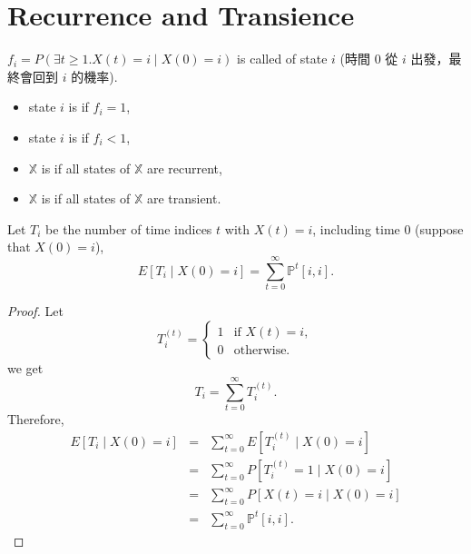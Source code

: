 \section{Recurrence and Transience}

\begin{definition}
$ f_{i} = P(\exists t \ge 1. X(t) = i \mid X(0) = i) $ is called  of state $ i $ {\small \color{gray} (時間 $ 0 $ 從 $ i $ 出發，最終會回到 $ i $ 的機率)}.
\begin{itemize}
  \item state $ i $ is  if $ f_{i} = 1 $,
  \item state $ i $ is  if $ f_{i} < 1 $,
  \item $ \mathbb{X} $ is  if all states of $ \mathbb{X} $ are recurrent,
  \item $ \mathbb{X} $ is  if all states of $ \mathbb{X} $ are transient.
\end{itemize}
\end{definition}

\begin{observation}
Let $ T_{i} $ be the number of time indices $ t $ with $ X(t) = i $, including time $ 0 $ (suppose that $ X(0) = i $),
\[ E[T_{i} \mid X(0) = i] = \sum_{t = 0}^{\infty} \mathbb{P}^{t}[i, i]. \]

\begin{proof}
Let
\[
T^{(t)}_{i} =
  \begin{cases}
    1 & \text{if } X(t) = i, \\
    0 & \text{otherwise.}
  \end{cases}
\]
we get
\[ T_{i} = \sum_{t = 0}^{\infty} T^{(t)}_{i}. \]
Therefore,
\begin{eqnarray*}
E[T_{i} \mid X(0) = i]
  & = & \sum_{t = 0}^{\infty} E[T^{(t)}_{i} \mid X(0) = i] \\
  & = & \sum_{t = 0}^{\infty} P[T^{(t)}_{i} = 1 \mid X(0) = i] \\
  & = & \sum_{t = 0}^{\infty} P[X(t) = i \mid X(0) = i] \\
  & = & \sum_{t = 0}^{\infty} \mathbb{P}^{t}[i, i].
\end{eqnarray*}
\end{proof}
\end{observation}

